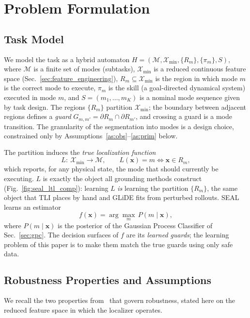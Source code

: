 \section{Problem Formulation}
\label{sec:formulation}

\subsection{Task Model}
We model the task as a hybrid automaton $H=(\mathcal{M},\mathcal{X}_{\min},\{R_m\},\{\pi_m\},S)$, where $\mathcal{M}$ is a finite set of modes (subtasks), $\mathcal{X}_{\min}$ is a reduced continuous feature space (Sec.~\ref{sec:feature_engineering}), $R_m\subseteq\mathcal{X}_{\min}$ is the region in which mode $m$ is the correct mode to execute, $\pi_m$ is the skill (a goal-directed dynamical system) executed in mode $m$, and $S=(m_1,\dots,m_K)$ is a nominal mode sequence given by task design. The regions $\{R_m\}$ partition $\mathcal{X}_{\min}$; the boundary between adjacent regions defines a \emph{guard} $G_{m,m'}=\partial R_m\cap\partial R_{m'}$, and crossing a guard is a mode transition. The granularity of the segmentation into modes is a design choice, constrained only by Assumptions~\ref{as:obs}--\ref{as:prim} below.

The partition induces the \emph{true localization function}
\begin{equation}
L:\ \mathcal{X}_{\min}\to\mathcal{M},\qquad L(\mathbf{x})=m \iff \mathbf{x}\in R_m ,
\end{equation}
which reports, for any physical state, the mode that should currently be executing. $L$ is exactly the object all grounding methods construct (Fig.~\ref{fig:seal_ltl_comp}): learning $L$ \emph{is} learning the partition $\{R_m\}$, the same object that TLI places by hand and GLiDE fits from perturbed rollouts. SEAL learns an estimator
\begin{equation}
f(\mathbf{x})=\arg\max_{m}\,P(m\mid\mathbf{x}),
\end{equation}
where $P(m\mid\mathbf{x})$ is the posterior of the Gaussian Process Classifier of Sec.~\ref{sec:gpc}. The decision surfaces of $f$ are its \emph{learned guards}; the learning problem of this paper is to make them match the true guards using only safe data.

\subsection{Robustness Properties and Assumptions}
We recall the two properties from~\cite{wang2022temporal} that govern robustness, stated here on the reduced feature space in which the localizer operates.

